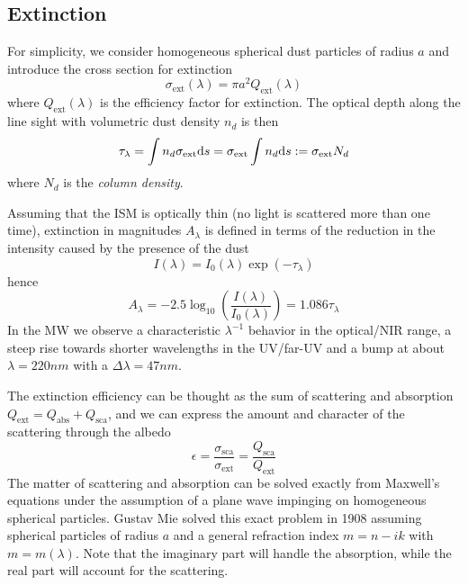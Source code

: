 \subsection{Extinction}

For simplicity, we consider homogeneous spherical dust particles of radius $a$ and introduce the cross section for extinction
\begin{equation*}
    \sigma_{\text{ext}}(\lambda) = \pi a^{2}Q_{\text{ext}}(\lambda)
\end{equation*}
where $Q_{\text{ext}}(\lambda)$ is the efficiency factor for extinction. The optical depth along the line sight with volumetric dust density $n_{d}$ is then
\begin{equation*}
    \tau_{\lambda} = \int n_{d} \sigma_{\text{ext}}\text{d}s = \sigma_{\text{ext}}\int n_{d}\text{d}s := \sigma_{\text{ext}}N_{d} 
\end{equation*}
where $N_{d}$ is the \emph{column density}.
\par Assuming that the ISM is optically thin (no light is scattered more than one time), extinction in magnitudes $A_{\lambda}$ is defined in terms of the reduction in the intensity caused by the presence of the dust
\begin{equation*}
    I(\lambda) = I_{0}(\lambda)\exp\left(-\tau_{\lambda}\right)
\end{equation*}
hence 
\begin{equation*}
    A_{\lambda} = -2.5\log_{10}\left(\frac{I(\lambda)}{I_{0}(\lambda)}\right) = 1.086\tau_{\lambda}
\end{equation*}
In the MW we observe a characteristic $\lambda^{-1}$ behavior in the optical/NIR range, a steep rise towards shorter wavelengths in the UV/far-UV and a bump at about $\lambda = 220\unit{nm}$ with a $\Delta\lambda = 47\unit{nm}$.
\par The extinction efficiency can be thought as the sum of scattering and absorption $Q_{\text{ext}}=Q_{\text{abs}}+Q_{\text{sca}}$, and we can express the amount and character of the scattering through the albedo
\begin{equation*}
    \epsilon = \frac{\sigma_{\text{sca}}}{\sigma_{\text{ext}}} = \frac{Q_{\text{sca}}}{Q_{\text{ext}}}
\end{equation*}
The matter of scattering and absorption can be solved exactly from Maxwell's equations under the assumption of a plane wave impinging on homogeneous spherical particles. Gustav Mie \cite{1908AnP...330..377M} solved this exact problem in 1908 assuming spherical particles of radius $a$ and a general refraction index $m = n-ik$ with $m=m(\lambda)$. Note that the imaginary part will handle the absorption, while the real part will account for the scattering.
